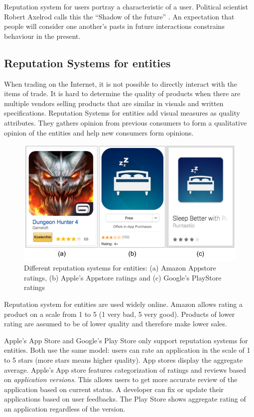 Reputation system for users portray a characteristic of a user. Political scientist Robert Axelrod calls this the ``Shadow of the future'' \cite{Axelrod1984}. An expectation that people will consider one another's pasts in future interactions constrains behaviour in the present.

\subsection{Reputation Systems for entities}

When trading on the Internet, it is not possible to directly interact with the items of trade. It is hard to determine the quality of products when there are multiple vendors selling products that are similar in visuals and written specifications. Reputation Systems for entities add visual measures as quality attributes. They gathers opinion from previous consumers to form a qualitative opinion of the entities and help new consumers form opinions.

\begin{figure}[!htb]
  \centering
  \includegraphics[width=12cm]{figures/rs_for_entities.pdf} 
  \caption{Different reputation systems for entities: (a) Amazon Appstore ratings, (b) Apple's Appstore ratings and (c) Google's PlayStore ratings}
  \label{fig:rs_for_entities}
\end{figure}

Reputation system for entities are used widely online. Amazon allows rating a product on a scale from 1 to 5 (1 very bad, 5 very good). Products of lower rating are assumed to be of lower quality and therefore make lower sales.

Apple's App Store and Google's Play Store only support reputation systems for entities. Both use the same model: users can rate an application in the scale of 1 to 5 stars (more stars means higher quality). App stores display the aggregate average. Apple's App store features categorization of ratings and reviews based on \emph{application versions}. This allows users to get more accurate review of the application based on current status. A developer can fix or update their applications based on user feedbacks. The Play Store shows aggregate rating of an application regardless of the version.

